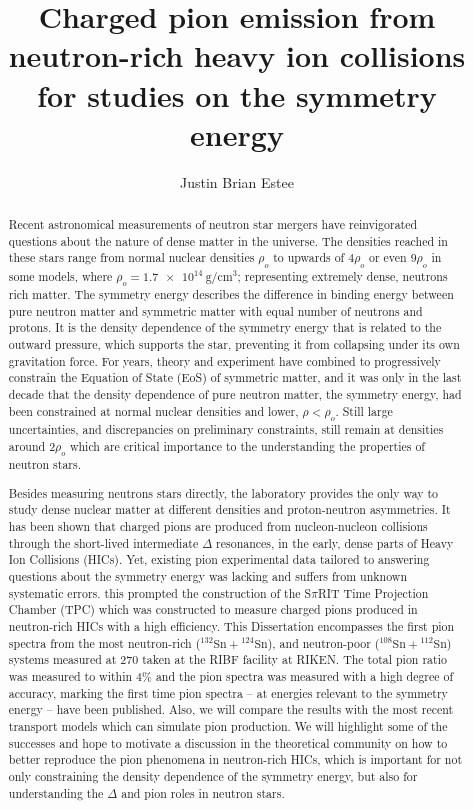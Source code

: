 \documentclass{altmsuphddissertation}
\author{Justin Brian Estee} %
\title{Charged pion emission from neutron-rich heavy ion collisions for studies on the symmetry energy} %
\newcommand{\spirit}{S$\pi$RIT }
\newcommand{\tin}[2]{{}^{#1}\mathrm{Sn} + {}^{#2}\mathrm{Sn}}
\begin{document}
\frontmatter
\maketitlepage %
\begin{abstract}

Recent astronomical measurements of neutron star mergers have reinvigorated questions about the nature of dense matter in the universe. The densities reached in these stars range from normal nuclear densities $\rho_o$ to upwards of $4\rho_o$ or even $9\rho_o$ in some models, where $\rho_o = \SI{1.7e14}{\gram\per\centi\metre\cubed}$; representing extremely dense, neutrons rich matter. The symmetry energy describes the difference in binding energy between pure neutron matter and symmetric matter with equal number of neutrons and protons. It is the density dependence of the symmetry energy that is related to the outward pressure, which supports the star, preventing it from collapsing under its own gravitation force. For years, theory and experiment  have combined to progressively constrain the Equation of State (EoS) of symmetric matter, and it was only in the last decade that the density dependence of pure neutron matter, the symmetry energy, had been constrained at normal nuclear densities and lower, $\rho < \rho_o$. Still large uncertainties, and discrepancies on preliminary constraints,  still remain at densities around 2$\rho_o$ which are critical importance to the understanding the properties of neutron stars.

Besides measuring neutrons stars directly, the laboratory provides the only way to study dense nuclear matter at different densities and proton-neutron asymmetries. It has been shown that charged pions are produced from nucleon-nucleon collisions through the short-lived intermediate $\Delta$ resonances, in the early, dense parts of Heavy Ion Collisions (HICs). Yet, existing pion experimental data tailored to answering questions about the symmetry energy was lacking and suffers from unknown systematic errors. this prompted the construction of the \spirit Time Projection Chamber (TPC) which was constructed to measure charged pions produced in neutron-rich HICs with a high efficiency. This Dissertation encompasses the first pion spectra from the most neutron-rich ($\tin{132}{124}$), and neutron-poor ($\tin{108}{112}$) systems measured at \SI{270}{\MeVA} taken at the RIBF facility at RIKEN. The total pion ratio was measured to within 4\% and the pion spectra was measured with a high degree of accuracy, marking the first time pion spectra  -- at energies relevant to the symmetry energy -- have been published.  Also, we will compare the results with the most recent transport models which can simulate pion production. We will highlight some of the successes and hope to motivate a discussion in the theoretical community on how to better reproduce the pion phenomena in neutron-rich HICs, which is important for not only constraining the density dependence of the symmetry energy, but also for understanding the $\Delta$ and pion roles in neutron stars. 
\end{abstract}
\end{document}
